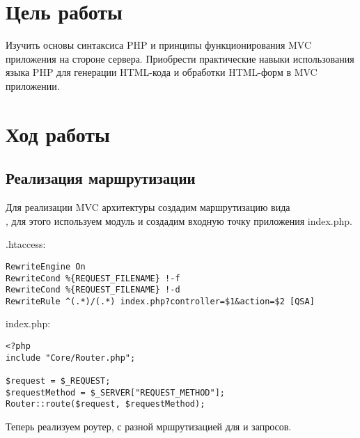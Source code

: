 \documentclass[a4paper,14pt]{extarticle}
\begin{document}


\section{Цель работы}
Изучить  основы синтаксиса PHP и принципы функционирования MVC приложения на
стороне сервера. Приобрести практические навыки использования языка PHP для
генерации HTML-кода и обработки HTML-форм в MVC приложении.

\section{Ход работы}
\subsection{Реализация маршрутизации}

Для реализации MVC архитектуры создадим маршрутизацию вида\\
, для этого используем  модуль и
создадим входную точку приложения index.php.

.htaccess:
\begin{lstlisting}
RewriteEngine On
RewriteCond %{REQUEST_FILENAME} !-f
RewriteCond %{REQUEST_FILENAME} !-d
RewriteRule ^(.*)/(.*) index.php?controller=$1&action=$2 [QSA]
\end{lstlisting}

index.php:
\begin{lstlisting}
<?php
include "Core/Router.php";

$request = $_REQUEST;
$requestMethod = $_SERVER["REQUEST_METHOD"];
Router::route($request, $requestMethod);
\end{lstlisting}

Теперь реализуем роутер, с разной мршрутизацией для  и 
запросов.
\end{document}
